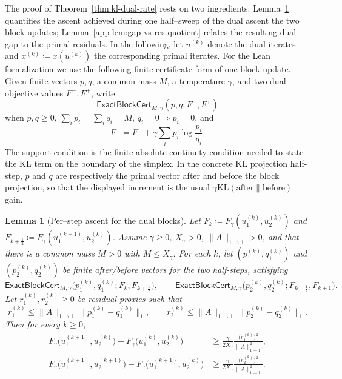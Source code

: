 \documentclass{article}
\theoremstyle{plain}
\newtheorem{lemma}{Lemma}[section]
\newcommand{\eqdef}{\coloneqq}
\newcommand{\Xmax}{X_\gamma}
\newcommand{\KL}{\mathrm{KL}}
\begin{document}
The proof of Theorem~\ref{thm:kl-dual-rate} rests on two ingredients:  Lemma~\ref{app-lem:per-step-ascent} quantifies the ascent achieved during one half--sweep of the dual ascent the two block updates; Lemma~\ref{app-lem:gap-vs-res-quotient} relates the resulting dual gap to the primal residuals.
%
In the following, let $u^{(k)}$ denote the dual iterates and $x^{(k)} \eqdef x(u^{(k)})$ the corresponding primal iterates.
For the Lean formalization we use the following finite certificate form of one block update.
Given finite vectors $p,q$, a common mass $M$, a temperature $\gamma$, and two dual objective
values $F^-,F^+$, write
\[
  \mathsf{ExactBlockCert}_{M,\gamma}(p,q;F^-,F^+)
\]
when $p,q\ge0$, $\sum_i p_i=\sum_i q_i=M$, $q_i=0\Rightarrow p_i=0$, and
\[
  F^+ = F^- + \gamma\sum_i p_i \log\!\frac{p_i}{q_i}.
\]
The support condition is the finite absolute-continuity condition needed to state the KL term on
the boundary of the simplex.  In the concrete KL projection half-step, $p$ and $q$ are respectively
the primal vector after and before the block projection, so that the displayed increment is the
usual $\gamma\KL(\text{after}\|\text{before})$ gain.

\begin{lemma}[Per--step ascent for the dual blocks]
\label{app-lem:per-step-ascent}
Let $F_k\eqdef F_\gamma(u_1^{(k)},u_2^{(k)})$ and
$F_{k+\frac12}\eqdef F_\gamma(u_1^{(k+1)},u_2^{(k)})$.
Assume $\gamma\ge0$, $\Xmax{}>0$, $\|A\|_{1\to1}>0$, and that there is a common mass
$M>0$ with $M\le\Xmax{}$.
For each $k$, let $(p_1^{(k)},q_1^{(k)})$ and $(p_2^{(k)},q_2^{(k)})$ be finite after/before
vectors for the two half-steps, satisfying
\[
  \mathsf{ExactBlockCert}_{M,\gamma}
    \bigl(p_1^{(k)},q_1^{(k)};F_k,F_{k+\frac12}\bigr),
  \qquad
  \mathsf{ExactBlockCert}_{M,\gamma}
    \bigl(p_2^{(k)},q_2^{(k)};F_{k+\frac12},F_{k+1}\bigr).
\]
Let $r_1^{(k)},r_2^{(k)}\ge0$ be residual proxies such that
\[
  r_1^{(k)}
    \le \|A\|_{1\to1}\,\|p_1^{(k)}-q_1^{(k)}\|_1,
  \qquad
  r_2^{(k)}
    \le \|A\|_{1\to1}\,\|p_2^{(k)}-q_2^{(k)}\|_1 .
\]
Then for every $k\ge0$,
\begin{align}
  F_{\gamma}\bigl(u_{1}^{(k+1)},u_{2}^{(k)}\bigr)
  -F_{\gamma}\bigl(u_{1}^{(k)},u_{2}^{(k)}\bigr)
  & \ge 
  \frac{\gamma}{2 \Xmax{}} 
  \frac{\bigl(r^{(k)}_{1}\bigr)^{2}}{\|A\|_{1\to1}^{2}},
  \tag{A1}\label{app-eq:A1-flow}\\[4pt]
  F_{\gamma}\bigl(u_{1}^{(k+1)},u_{2}^{(k+1)}\bigr)
  -F_{\gamma}\bigl(u_{1}^{(k+1)},u_{2}^{(k)}\bigr)
  & \ge 
  \frac{\gamma}{2 \Xmax{}} 
  \frac{\bigl(r^{(k)}_{2}\bigr)^{2}}{\|A\|_{1\to1}^{2}}.
  \tag{A2}\label{app-eq:A2-flow}
\end{align}
\end{lemma}
\end{document}
